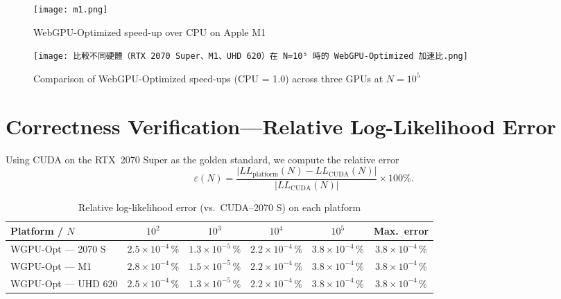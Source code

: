 \documentclass[PhD]{PHlab-thesis}
\begin{document}
\begin{figure}[h]
    \centering
    \texttt{[image: m1.png]}
    \caption{WebGPU-Optimized speed-up over CPU on Apple M1}
    \label{fig:m1}
\end{figure}

\begin{figure}[h]
    \centering
    \texttt{[image: 比較不同硬體（RTX 2070 Super、M1、UHD 620）在 N=10⁵ 時的 WebGPU-Optimized 加速比.png]}
    \caption{Comparison of WebGPU-Optimized speed-ups (CPU = 1.0) across three GPUs at $N=10^5$}
    \label{fig:cross-hw1}
\end{figure}
\clearpage


\section{Correctness Verification—Relative Log-Likelihood Error}
Using CUDA on the RTX~2070 Super as the golden standard, we compute the relative error
\[
\varepsilon(N)=\frac{\lvert LL_{\text{platform}}(N)-LL_{\text{CUDA}}(N)\rvert}
{\lvert LL_{\text{CUDA}}(N)\rvert}\times 100\%.
\]

\begin{table}[h]
  \centering
  \caption{Relative log-likelihood error (vs.\ CUDA–2070 S) on each platform}
  \label{tab:likelihood_error}
  \setlength{\tabcolsep}{6pt}
  \renewcommand{\arraystretch}{1.7}
  \small
  \begin{tabularx}{\textwidth}{@{} X c c c c c @{}}
    \toprule
    Platform / $N$      & $10^2$           & $10^3$           & $10^4$           & $10^5$           & Max.\ error    \\
    \midrule
    WGPU-Opt — 2070 S   & $2.5\times10^{-4}\,\%$ & $1.3\times10^{-5}\,\%$ & $2.2\times10^{-4}\,\%$ & $3.8\times10^{-4}\,\%$ & $3.8\times10^{-4}\,\%$ \\
    WGPU-Opt — M1       & $2.8\times10^{-4}\,\%$ & $1.5\times10^{-5}\,\%$ & $2.2\times10^{-4}\,\%$ & $3.8\times10^{-4}\,\%$ & $3.8\times10^{-4}\,\%$ \\
    WGPU-Opt — UHD 620  & $2.5\times10^{-4}\,\%$ & $1.3\times10^{-5}\,\%$ & $2.2\times10^{-4}\,\%$ & $3.8\times10^{-4}\,\%$ & $3.8\times10^{-4}\,\%$ \\
    \bottomrule
  \end{tabularx}
\end{table}
\end{document}

